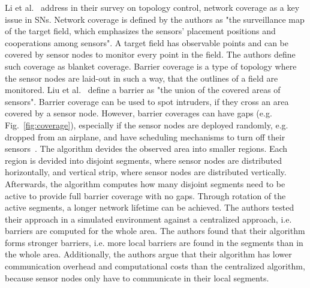 Li et al.~\cite{li2013survey} address in their survey on topology control,
network coverage as a key issue in \acp{SN}. Network coverage is defined by the
authors as "the surveillance map of the target field, which emphasizes the
sensors' placement positions and cooperations among sensors". A target field
has observable points and can be covered by sensor nodes to monitor every point
in the field. The authors define such coverage as blanket coverage. Barrier
coverage is a type of topology where the sensor nodes are laid-out in such a
way, that the outlines of a field are monitored. Liu et
al.~\cite{liu2008strong} define a barrier as "the union of the covered areas of
sensors". Barrier coverage can be used to spot intruders, if they cross an area
covered by a sensor node. However, barrier coverages can have gaps (e.g.
Fig.~\ref{fig:coverage}), especially if the sensor nodes are deployed randomly,
e.g. dropped from an airplane, and have scheduling mechanisms to turn off their
sensors~\cite{liu2008strong}. The algorithm devides the observed area into
smaller regions. Each region is devided into disjoint segments, where sensor
nodes are distributed horizontally, and vertical strip, where sensor nodes are
distributed vertically. Afterwards, the algorithm computes how many disjoint
segments need to be active to provide full barrier coverage with no gaps.
Through rotation of the active segments, a longer network lifetime can be
achieved. The authors tested their approach in a simulated environment against
a centralized approach, i.e. barriers are computed for the whole area. The
authors found that their algorithm forms stronger barriers, i.e. more local
barriers are found in the segments than in the whole area. Additionally, the
authors argue that their algorithm has lower communication overhead and
computational costs than the centralized algorithm, because sensor nodes only
have to communicate in their local segments.


